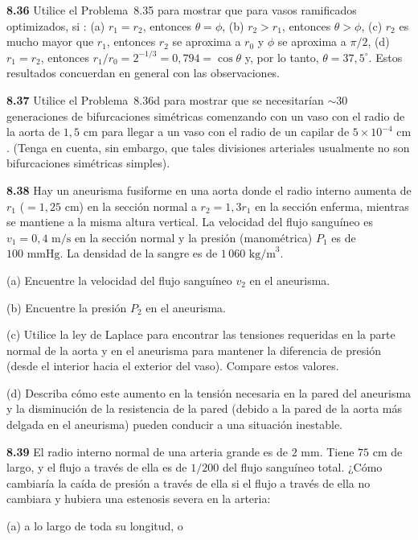 \documentclass[12pt]{book}
\begin{document}
\textbf{8.36} Utilice el Problema~8.35 para mostrar que para vasos ramificados optimizados, si \cite{24}:
(a) $r_1 = r_2$, entonces $\theta = \phi$,
(b) $r_2 > r_1$, entonces $\theta > \phi$,
(c) $r_2$ es mucho mayor que $r_1$, entonces $r_2$ se aproxima a $r_0$ y $\phi$ se aproxima a $\pi/2$,
(d) $r_1 = r_2$, entonces $r_1/r_0 = 2^{-1/3} = 0{,}794 = \cos\theta$ y, por lo tanto, $\theta = 37{,}5^\circ$.
Estos resultados concuerdan en general con las observaciones.

\textbf{8.37} Utilice el Problema~8.36d para mostrar que se necesitarían ${\sim}30$ generaciones de bifurcaciones simétricas comenzando con un vaso con el radio de la aorta de $1{,}5\text{ cm}$ para llegar a un vaso con el radio de un capilar de $5 \times 10^{-4}\text{ cm}$ \cite{24}. (Tenga en cuenta, sin embargo, que tales divisiones arteriales usualmente no son bifurcaciones simétricas simples).

\textbf{8.38} Hay un aneurisma fusiforme en una aorta donde el radio interno aumenta de $r_1$ ($= 1{,}25\text{ cm}$) en la sección normal a $r_2 = 1{,}3 r_1$ en la sección enferma, mientras se mantiene a la misma altura vertical. La velocidad del flujo sanguíneo es $v_1 = 0{,}4\text{ m/s}$ en la sección normal y la presión (manométrica) $P_1$ es de $100\text{ mmHg}$. La densidad de la sangre es de $1\,060\text{ kg/m}^3$.

(a) Encuentre la velocidad del flujo sanguíneo $v_2$ en el aneurisma.

(b) Encuentre la presión $P_2$ en el aneurisma.

(c) Utilice la ley de Laplace para encontrar las tensiones requeridas en la parte normal de la aorta y en el aneurisma para mantener la diferencia de presión (desde el interior hacia el exterior del vaso). Compare estos valores.

(d) Describa cómo este aumento en la tensión necesaria en la pared del aneurisma y la disminución de la resistencia de la pared (debido a la pared de la aorta más delgada en el aneurisma) pueden conducir a una situación inestable.

\textbf{8.39} El radio interno normal de una arteria grande es de $2\text{ mm}$. Tiene $75\text{ cm}$ de largo, y el flujo a través de ella es de $1/200$ del flujo sanguíneo total. ¿Cómo cambiaría la caída de presión a través de ella si el flujo a través de ella no cambiara y hubiera una estenosis severa en la arteria:

(a) a lo largo de toda su longitud, o
\end{document}
